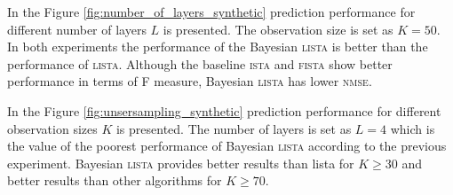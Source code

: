 \documentclass[letterpaper]{article}
\begin{document}
In the Figure \ref{fig:number_of_layers_synthetic} prediction performance for different number of layers $L$ is presented. The observation size is set as $K=50$. In both experiments the performance of the Bayesian \textsc{lista} is better than the performance of \textsc{lista}. Although the baseline \textsc{ista} and \textsc{fista} show better performance in terms of F measure, Bayesian \textsc{lista} has lower \textsc{nmse}.

In the Figure \ref{fig:unsersampling_synthetic} prediction performance for different observation sizes $K$ is presented. The number of layers is set as $L=4$ which is the value of the poorest performance of Bayesian \textsc{lista} according to the previous experiment. Bayesian \textsc{lista} provides better results than {lista} for $K \ge 30$ and better results than other algorithms for $K \ge 70$.
\end{document}
